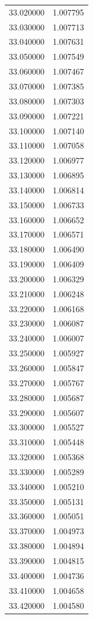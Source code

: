 \begin{tabular}{rr}
33.020000 & 1.007795 \\
33.030000 & 1.007713 \\
33.040000 & 1.007631 \\
33.050000 & 1.007549 \\
33.060000 & 1.007467 \\
33.070000 & 1.007385 \\
33.080000 & 1.007303 \\
33.090000 & 1.007221 \\
33.100000 & 1.007140 \\
33.110000 & 1.007058 \\
33.120000 & 1.006977 \\
33.130000 & 1.006895 \\
33.140000 & 1.006814 \\
33.150000 & 1.006733 \\
33.160000 & 1.006652 \\
33.170000 & 1.006571 \\
33.180000 & 1.006490 \\
33.190000 & 1.006409 \\
33.200000 & 1.006329 \\
33.210000 & 1.006248 \\
33.220000 & 1.006168 \\
33.230000 & 1.006087 \\
33.240000 & 1.006007 \\
33.250000 & 1.005927 \\
33.260000 & 1.005847 \\
33.270000 & 1.005767 \\
33.280000 & 1.005687 \\
33.290000 & 1.005607 \\
33.300000 & 1.005527 \\
33.310000 & 1.005448 \\
33.320000 & 1.005368 \\
33.330000 & 1.005289 \\
33.340000 & 1.005210 \\
33.350000 & 1.005131 \\
33.360000 & 1.005051 \\
33.370000 & 1.004973 \\
33.380000 & 1.004894 \\
33.390000 & 1.004815 \\
33.400000 & 1.004736 \\
33.410000 & 1.004658 \\
33.420000 & 1.004580 \\

\end{tabular}
